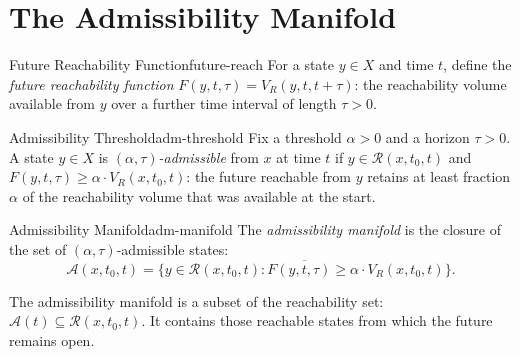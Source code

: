 \documentclass[12pt,twoside,openright]{book}
\newcommand{\reach}{\mathcal{R}}
\newcommand{\adm}{\mathcal{A}}
\begin{document}
\section{The Admissibility Manifold}
\label{sec:ch14-manifold}

\begin{definition}{Future Reachability Function}{future-reach}
  For a state $y\in X$ and time $t$, define the
  \emph{future reachability function}
  $F(y,t,\tau) = V_R(y,t,t+\tau)$: the reachability volume
  available from $y$ over a further time interval of length
  $\tau > 0$.
\end{definition}

\begin{definition}{Admissibility Threshold}{adm-threshold}
  Fix a threshold $\alpha>0$ and a horizon $\tau>0$. A
  state $y\in X$ is \emph{$(\alpha,\tau)$-admissible} from
  $x$ at time $t$ if $y\in\reach(x,t_0,t)$ and
  $F(y,t,\tau) \ge \alpha\cdot V_R(x,t_0,t)$: the future
  reachable from $y$ retains at least fraction $\alpha$ of
  the reachability volume that was available at the start.
\end{definition}

\begin{definition}{Admissibility Manifold}{adm-manifold}
  The \emph{admissibility manifold} is the closure of the
  set of $(\alpha,\tau)$-admissible states:
  \[
    \adm(x,t_0,t)
    = \overline{\{
        y \in \reach(x,t_0,t) :
        F(y,t,\tau) \ge \alpha\cdot V_R(x,t_0,t)
      \}}.
  \]
\end{definition}

The admissibility manifold is a subset of the reachability
set: $\adm(t) \subseteq \reach(x,t_0,t)$. It contains those
reachable states from which the future
remains open.
\end{document}
